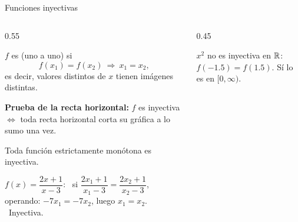 \documentclass[10pt,aspectratio=169]{beamer}
\begin{document}
\begin{frame}{Funciones inyectivas}
  \begin{columns}
    \begin{column}{0.55\textwidth}
      \begin{definicion}
        $f$ es  (uno a uno) si
        \[ f(x_1)=f(x_2)\ \Rightarrow\ x_1=x_2, \]
        es decir, valores distintos de $x$ tienen imágenes distintas.
      \end{definicion}
      \textbf{Prueba de la recta horizontal:} $f$ es inyectiva $\iff$ toda recta horizontal corta su gráfica a lo sumo una vez.
      \begin{proposicion}
        Toda función estrictamente monótona es inyectiva.
      \end{proposicion}
      \begin{ejemplo}[9]
        $f(x)=\dfrac{2x+1}{x-3}$: \ si $\dfrac{2x_1+1}{x_1-3}=\dfrac{2x_2+1}{x_2-3}$, operando: $-7x_1=-7x_2$, luego $x_1=x_2$. \ Inyectiva.
      \end{ejemplo}
    \end{column}
    \begin{column}{0.45\textwidth}
      \centering

      \small $x^2$ no es inyectiva en $\mathbb{R}$: $f(-1.5)=f(1.5)$. Sí lo es en $[0,\infty)$.
    \end{column}
  \end{columns}
\end{frame}
\end{document}
